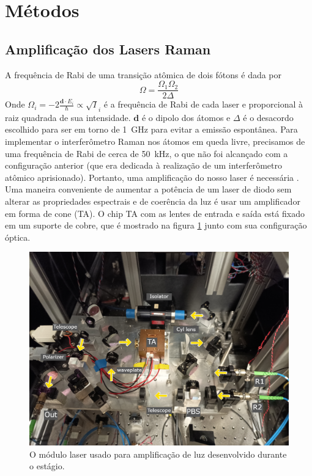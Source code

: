 \section{Métodos}
\subsection{Amplificação dos Lasers Raman}

A frequência de Rabi de uma transição atômica de dois fótons é dada por 
\begin{equation}
    \Omega = \frac{\Omega_1\Omega_2}{2\Delta}
\end{equation}
Onde $\Omega_i=-2\frac{\mathbf d \cdot E_i}{\hbar} \propto \sqrt I_i$ é a frequência de Rabi de cada laser e proporcional à raiz quadrada de sua intensidade. $\mathbf d$ é o dipolo dos átomos e $\Delta$ é o desacordo escolhido para ser em torno de \SI{1}{GHz} para evitar a emissão espontânea. 
Para implementar o interferômetro Raman nos átomos em queda livre, precisamos de uma frequência de Rabi de cerca de \SI{50}{kHz}, o que não foi alcançado com a configuração anterior (que era dedicada à realização de um interferômetro atômico aprisionado). Portanto, uma amplificação do nosso laser é necessária \cite{cheinet2006conception}. Uma maneira conveniente de aumentar a potência de um laser de diodo sem alterar as propriedades espectrais e de coerência da luz é usar um amplificador em forma de cone (\gls{TA}). O chip \gls{TA} com as lentes de entrada e saída está fixado em um suporte de cobre, que é mostrado na figura \ref{fig:mount} junto com sua configuração óptica.

\begin{figure}
    \centering
    \includegraphics[width=0.7\linewidth]{figures/TA-mount-labels.png}
    \caption{O módulo laser usado para amplificação de luz desenvolvido durante o estágio.}
    \label{fig:mount}
\end{figure}

